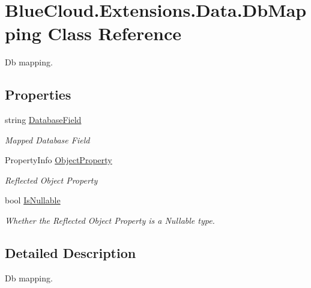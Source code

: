 \hypertarget{class_blue_cloud_1_1_extensions_1_1_data_1_1_db_mapping}{}\section{Blue\+Cloud.\+Extensions.\+Data.\+Db\+Mapping Class Reference}
\label{class_blue_cloud_1_1_extensions_1_1_data_1_1_db_mapping}


Db mapping.  


\subsection*{Properties}
\begin{DoxyCompactItemize}
\item 
string \mbox{\hyperlink{class_blue_cloud_1_1_extensions_1_1_data_1_1_db_mapping_a1fbf6098300d148f91008076c86df606}{Database\+Field}}
\begin{DoxyCompactList}\small\item\em Mapped Database Field \end{DoxyCompactList}\item 
Property\+Info \mbox{\hyperlink{class_blue_cloud_1_1_extensions_1_1_data_1_1_db_mapping_a33404ee5850071ce4595ff117ed679e6}{Object\+Property}}
\begin{DoxyCompactList}\small\item\em Reflected Object Property \end{DoxyCompactList}\item 
bool \mbox{\hyperlink{class_blue_cloud_1_1_extensions_1_1_data_1_1_db_mapping_a2346e649c588333fed4639dd9ac72a4c}{Is\+Nullable}}
\begin{DoxyCompactList}\small\item\em Whether the Reflected Object Property is a Nullable type. \end{DoxyCompactList}\end{DoxyCompactItemize}


\subsection{Detailed Description}
Db mapping. 



